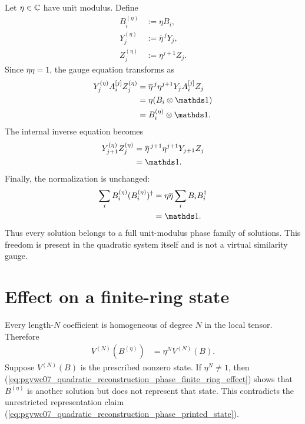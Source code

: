 \documentclass{article}
\begin{document}
Let $\eta\in\mathbb{C}$ have unit modulus. Define
\begin{align}
    B_i^{(\eta)}
     & :=\eta B_i,
    \label{eq:pgvwc07_quadratic_reconstruction_phase_rescaled_tensor}     \\
    Y_j^{(\eta)}
     & :=\overline{\eta}^{\,j}Y_j,
    \label{eq:pgvwc07_quadratic_reconstruction_phase_rescaled_left_gauge} \\
    Z_j^{(\eta)}
     & :=\eta^{j+1}Z_j.
    \label{eq:pgvwc07_quadratic_reconstruction_phase_rescaled_right_gauge}
\end{align}
Since $\overline\eta\eta=1$, the gauge equation transforms as
\begin{align}
    Y_j^{(\eta)}A_i^{[j]}Z_j^{(\eta)}
     & =\overline\eta^{\,j}\eta^{j+1}
    Y_jA_i^{[j]}Z_j
    \label{eq:pgvwc07_quadratic_reconstruction_phase_gauge_rescaling_step}   \\
     & =\eta(B_i\otimes\Id)
    \label{eq:pgvwc07_quadratic_reconstruction_phase_gauge_rescaling_tensor} \\
     & =B_i^{(\eta)}\otimes\Id.
    \label{eq:pgvwc07_quadratic_reconstruction_phase_gauge_rescaling_result}
\end{align}
The internal inverse equation becomes
\begin{align}
    Y_{j+1}^{(\eta)}Z_j^{(\eta)}
     & =\overline\eta^{\,j+1}\eta^{j+1}Y_{j+1}Z_j
    \label{eq:pgvwc07_quadratic_reconstruction_phase_inverse_rescaling_step} \\
     & =\Id.
    \label{eq:pgvwc07_quadratic_reconstruction_phase_inverse_rescaling_result}
\end{align}
Finally, the normalization is unchanged:
\begin{align}
    \sum_iB_i^{(\eta)}(B_i^{(\eta)})^\dagger
     & =\eta\overline\eta\sum_iB_iB_i^\dagger
    \label{eq:pgvwc07_quadratic_reconstruction_phase_normalization_rescaling_step} \\
     & =\Id.
    \label{eq:pgvwc07_quadratic_reconstruction_phase_normalization_rescaling_result}
\end{align}
Thus every solution belongs to a full unit-modulus phase family of solutions.
This freedom is present in the quadratic system itself and is not a virtual
similarity gauge.

\section{Effect on a finite-ring state}

Every length-$N$ coefficient is homogeneous of degree $N$ in the local tensor.
Therefore
\begin{align}
    V^{(N)}(B^{(\eta)})
     & =\eta^N V^{(N)}(B).
    \label{eq:pgvwc07_quadratic_reconstruction_phase_finite_ring_effect}
\end{align}
Suppose $V^{(N)}(B)$ is the prescribed nonzero state. If $\eta^N\neq1$, then
(\ref{eq:pgvwc07_quadratic_reconstruction_phase_finite_ring_effect}) shows that
$B^{(\eta)}$ is another solution but does not represent that state. This
contradicts the unrestricted representation claim
(\ref{eq:pgvwc07_quadratic_reconstruction_phase_printed_state}).
\end{document}
